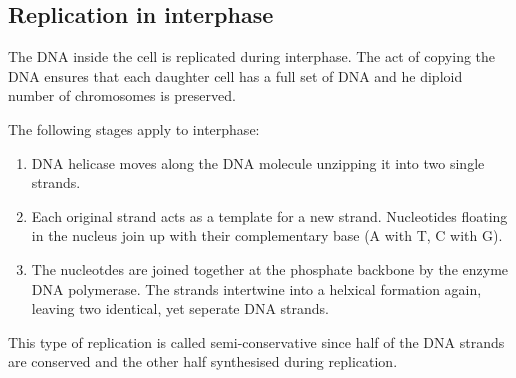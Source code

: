 \documentclass{article}
\begin{document}
\subsection*{Replication in interphase}

The DNA inside the cell is replicated during interphase. The act of copying the
DNA ensures that each daughter cell has a full set of DNA and he diploid number
of chromosomes is preserved.

The following stages apply to interphase:

\begin{enumerate}

	\item DNA helicase moves along the DNA molecule unzipping it into two single
	strands.

	\item Each original strand acts as a template for a new strand. Nucleotides
	floating in the nucleus join up with their complementary base (A with T, C
	with G). 

    \item The nucleotdes are joined together at the phosphate backbone by the
	enzyme DNA polymerase. The strands intertwine into a helxical formation 
	again, leaving two identical, yet seperate DNA strands.

\end{enumerate}

This type of replication is called semi-conservative since half of the DNA
strands are conserved and the other half synthesised during replication.
\end{document}
